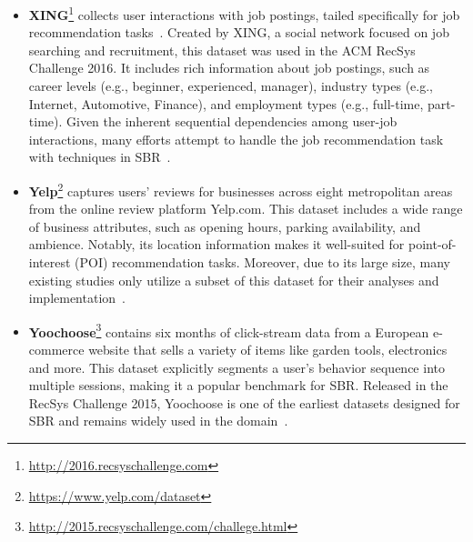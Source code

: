 \documentclass[lettersize,journal]{IEEEtran}
\begin{document}
\begin{itemize}
    \item \textbf{XING}\footnote{\url{http://2016.recsyschallenge.com}} collects user interactions with job postings, tailed specifically for job recommendation tasks~\cite{Du@AAAI2024,Francisco@RecSys2019}. Created by XING, a social network focused on job searching and recruitment, this dataset was used in the ACM RecSys Challenge 2016. It includes rich information about job postings, such as career levels (e.g., beginner, experienced, manager), industry types (e.g., Internet, Automotive, Finance), and employment types (e.g., full-time, part-time). Given the inherent sequential dependencies among user-job interactions, many efforts attempt to handle the job recommendation task with techniques in SBR~\cite{Wu@WWW2020,Kermany@WSDM2022Short,pang@WSDM2022,Zhang@TKDE2022}.

    \item \textbf{Yelp}\footnote{\url{https://www.yelp.com/dataset}} captures users' reviews for businesses across eight metropolitan areas from the online review platform Yelp.com. This dataset includes a wide range of business attributes, such as opening hours, parking availability, and ambience. Notably, its location information makes it well-suited for point-of-interest (POI) recommendation tasks. Moreover, due to its large size, many existing studies only utilize a subset of this dataset for their analyses and implementation~\cite{Tian@CIKM2022,Liu@CIKM2023Text,Chang@WSDM2024,FineRec}. 

    \item \textbf{Yoochoose}\footnote{\url{http://2015.recsyschallenge.com/challege.html}} contains six months of click-stream data from a European e-commerce website that sells a variety of items like garden tools, electronics and more. This dataset explicitly segments a user's behavior sequence into multiple sessions, making it a popular benchmark for SBR. Released in the RecSys Challenge 2015, Yoochoose is one of the earliest datasets designed for SBR and remains widely used in the domain~\cite{RepeatNet,choi@WSDM2022,Chen@SIGIR2022}.
    
\end{itemize}
\end{document}
